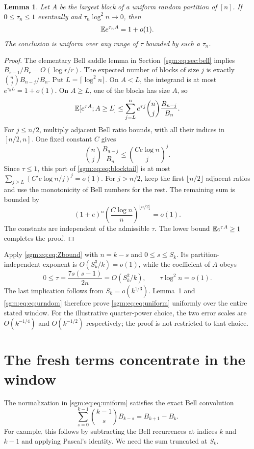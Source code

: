 \documentclass[11pt,letterpaper]{article}
\newtheorem{lemma}[theorem]{Lemma}\newtheorem{proposition}[theorem]{Proposition}\newtheorem{corollary}[theorem]{Corollary}
\theoremstyle{remark}\newtheorem{remark}[theorem]{Remark}
\theoremstyle{definition}\newtheorem{definition}[theorem]{Definition}
\begin{document}
\begin{lemma}\label{sgm:eq:lem:maxblock}
Let $A$ be the largest block of a uniform random partition of $[n]$. If $0\le\tau_n\le1$ eventually and $\tau_n\log^2n\to0$, then
\[
 \mathbb E e^{\tau_n A}=1+o(1).
\]
The conclusion is uniform over any range of $\tau$ bounded by such a $\tau_n$.
\end{lemma}
\begin{proof}
The elementary Bell saddle lemma in Section~\ref{sgm:eq:sec:bell} implies
$B_{r-1}/B_r=O(\log r/r)$. The expected number of blocks of size $j$ is exactly
$\binom nj B_{n-j}/B_n$. Put $L=\lceil\log^2n\rceil$. On $A<L$, the integrand is at most $e^{\tau_n L}=1+o(1)$. On $A\ge L$, one of the blocks has size $A$, so
\begin{equation}\label{sgm:eq:eq:blocktail}
 \mathbb E[e^{\tau A};A\ge L]
 \le\sum_{j=L}^{n}e^{\tau j}\binom nj\frac{B_{n-j}}{B_n}.
\end{equation}
For $j\le n/2$, multiply adjacent Bell ratio bounds, with all their indices in $[n/2,n]$. One fixed constant $C$ gives
\[
 \binom nj\frac{B_{n-j}}{B_n}
 \le\left(\frac{Ce\log n}{j}\right)^j.
\]
Since $\tau\le1$, this part of \eqref{sgm:eq:eq:blocktail} is at most
$\sum_{j\ge L}(C'e\log n/j)^j=o(1)$.
For $j>n/2$, keep the first $\lfloor n/2\rfloor$ adjacent ratios and use the monotonicity of Bell numbers for the rest. The remaining sum is bounded by
\[
 (1+e)^n\left(\frac{C\log n}{n}\right)^{\lfloor n/2\rfloor}=o(1).
\]
The constants are independent of the admissible $\tau$. The lower bound $\mathbb E e^{\tau A}\ge1$ completes the proof.
\end{proof}

Apply \eqref{sgm:eq:eq:Zbound} with $n=k-s$ and $0\le s\le S_k$. Its partition-independent exponent is $O(S_k^3/k)=o(1)$, while the coefficient of $A$ obeys
\[
 0\le\tau=\frac{7s(s-1)}{2n}=O(S_k^2/k),
 \qquad \tau\log^2n=o(1).
\]
The last implication follows from $S_k=o(k^{1/3})$. Lemma~\ref{sgm:eq:lem:maxblock} and \eqref{sgm:eq:eq:urndom} therefore prove \eqref{sgm:eq:eq:uniform} uniformly over the entire stated window. For the illustrative quarter-power choice, the two error scales are $O(k^{-1/4})$ and $O(k^{-1/2})$ respectively; the proof is not restricted to that choice.

\section{The fresh terms concentrate in the window}\label{sgm:eq:sec:fresh}
The normalization in \eqref{sgm:eq:eq:uniform} satisfies the exact Bell convolution
\begin{equation}\label{sgm:eq:eq:Bellconv}
 \sum_{s=0}^{k-1}\binom{k-1}{s}B_{k-s}=B_{k+1}-B_k.
\end{equation}
For example, this follows by subtracting the Bell recurrences at indices $k$ and $k-1$ and applying Pascal's identity. We need the sum truncated at $S_k$.
\end{document}
